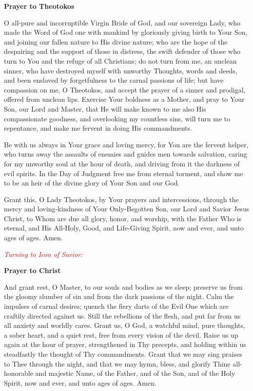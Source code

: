 \begin{center}
\textbf{Prayer to Theotokos}
\end{center} 

\begin{hang}
\noindent{}O all-pure and incorruptible Virgin Bride of God, and our sovereign Lady, who made the Word of God one with mankind by gloriously giving birth to Your Son, and joining our fallen nature to His divine nature; who are the hope of the despairing and the support of those in distress, the swift defender of those who turn to You and the refuge of all Christians; do not turn from me, an unclean sinner, who have destroyed myself with unworthy Thoughts, words and deeds, and been enslaved by forgetfulness to the carnal passions of life; but have compassion on me, O Theotokos, and accept the prayer of a sinner and prodigal, offered from unclean lips.  Exercise Your boldness as a Mother, and pray to Your Son, our Lord and Master, that He will make known to me also His compassionate goodness, and overlooking my countless sins, will turn me to repentance, and make me fervent in doing His commandments.

Be with us always in Your grace and loving mercy, for You are the fervent helper, who turns away the assaults of enemies and guides men towards salvation, caring for my unworthy soul at the hour of death, and driving from it the darkness of evil spirits.  In the Day of Judgment free me from eternal torment, and show me to be an heir of the divine glory of Your Son and our God.

Grant this, O Lady Theotokos, by Your prayers and intercessions, through the mercy and loving-kindness of Your Only-Begotten Son, our Lord and Savior Jesus Christ, to Whom are due all glory, honor, and worship, with the Father Who is eternal, and His All-Holy, Good, and Life-Giving Spirit, now and ever, and unto ages of ages.  Amen.

\end{hang}

\textcolor{red}{\textit{Turning to Icon of Savior:}}

\begin{center}
\textbf{Prayer to Christ}
\end{center}

\begin{hang}
\noindent\makebox[\indt][l]{}And grant rest, O Master, to our souls and bodies as we sleep; preserve us from the gloomy slumber of sin and from the dark passions of the night. Calm the impulses of carnal desires; quench the fiery darts of the Evil One which are craftily directed against us.  Still the rebellions of the flesh, and put far from us all anxiety and worldly cares. Grant us, O God, a watchful mind, pure thoughts, a sober heart, and a quiet rest, free from every vision of the devil.  Raise us up again at the hour of prayer, strengthened in Thy precepts, and holding within us steadfastly the thought of Thy commandments.  Grant that we may sing praises to Thee through the night, and that we may hymn, bless, and glorify Thine all-honorable and majestic Name, of the Father, and of the Son, and of the Holy Spirit, now and ever, and unto ages of ages.  Amen. 
\end{hang}

